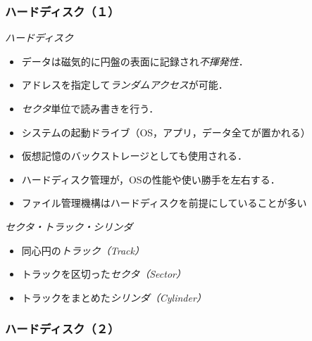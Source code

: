 \documentclass[unicode]{beamer}                   %
\begin{document}
\begin{frame}
  \frametitle{ハードディスク（１）}
  \emph{ハードディスク}
  \begin{itemize}
  \item データは磁気的に円盤の表面に記録され\emph{不揮発性}．
  \item アドレスを指定して\emph{ランダムアクセス}が可能．
  \item \emph{セクタ}単位で読み書きを行う．
  \item システムの起動ドライブ（OS，アプリ，データ全てが置かれる）
  \item 仮想記憶のバックストレージとしても使用される．
  \item ハードディスク管理が，OSの性能や使い勝手を左右する．
  \item ファイル管理機構はハードディスクを前提にしていることが多い
  \end{itemize}
  \vfill
  \emph{セクタ・トラック・シリンダ}
  \begin{itemize}
  \item 同心円の\emph{トラック（Track）}
  \item トラックを区切った\emph{セクタ（Sector）}
  \item トラックをまとめた\emph{シリンダ（Cylinder）}
  \end{itemize}
\end{frame}

\begin{frame}
  \frametitle{ハードディスク（２）}
\end{frame}
\end{document}

